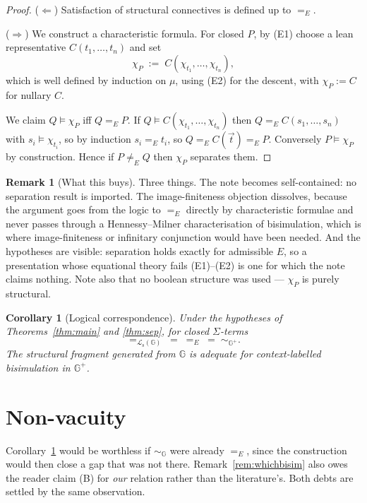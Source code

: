 \documentclass[11pt]{article}
\theoremstyle{plain}
\newtheorem{corollary}[theorem]{Corollary}
\theoremstyle{definition}
\newtheorem{remark}[theorem]{Remark}
\newcommand{\Gg}{\mathbb{G}}
\newcommand{\Lo}{\mathcal{L}}
\newcommand{\bis}{\sim}
\begin{document}
\begin{proof}
($\Leftarrow$) Satisfaction of structural connectives is defined up to $=_E$.

($\Rightarrow$) We construct a characteristic formula. For closed $P$, by (E1) choose a lean
representative $C(t_1,\dots,t_n)$ and set
\[
\chi_P \;:=\; C(\chi_{t_1},\dots,\chi_{t_n}),
\]
which is well defined by induction on $\mu$, using (E2) for the descent, with $\chi_P := C$ for nullary
$C$.

We claim $Q \models \chi_P$ iff $Q =_E P$. If $Q \models C(\chi_{t_1},\dots,\chi_{t_n})$ then
$Q =_E C(s_1,\dots,s_n)$ with $s_i \models \chi_{t_i}$, so by induction $s_i =_E t_i$, so
$Q =_E C(\vec t) =_E P$. Conversely $P \models \chi_P$ by construction. Hence if $P \neq_E Q$ then
$\chi_P$ separates them.
\end{proof}

\begin{remark}[What this buys]
Three things. The note becomes self-contained: no separation result is imported. The image-finiteness
objection dissolves, because the argument goes from the logic to $=_E$ directly by characteristic
formulae and never passes through a Hennessy--Milner characterisation of bisimulation, which is where
image-finiteness or infinitary conjunction would have been needed. And the hypotheses are visible:
separation holds exactly for admissible $E$, so a presentation whose equational theory fails
(E1)--(E2) is one for which the note claims nothing. Note also that no boolean structure was used ---
$\chi_P$ is purely structural.
\end{remark}

\begin{corollary}[Logical correspondence]
\label{cor:adequacy}
Under the hypotheses of Theorems~\ref{thm:main} and \ref{thm:sep}, for closed $\Sigma$-terms
\[
=_{\Lo_{\mathrm{s}}(\Gg)} \;=\; =_E \;=\; \bis_{\Gg^+} .
\]
The structural fragment generated from $\Gg$ is adequate for context-labelled bisimulation in $\Gg^+$.
\end{corollary}

\section{Non-vacuity}
\label{sec:nonvacuity}

Corollary~\ref{cor:adequacy} would be worthless if $\bis_\Gg$ were already $=_E$, since the
construction would then close a gap that was not there. Remark~\ref{rem:whichbisim} also owes the
reader claim (B) for \emph{our} relation rather than the literature's. Both debts are settled by the
same observation.
\end{document}
